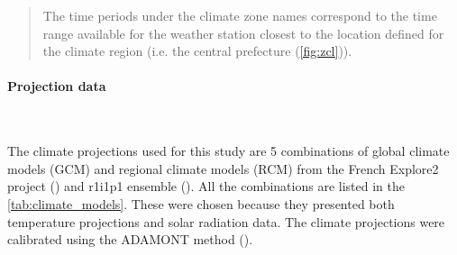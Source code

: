 \documentclass[11pt]{article}
\begin{document}
        \begin{table}[ht]
            \caption{\label{tab:rmse_safran_mf} Table of differences between SAFRAN reanalysis and Météo-France observation data (mean temperature MT and global radiation GR) for the 8 French climate zones.}
            \begin{quote}
                \vspace{-2mm}
                \small\noindent
                The time periods under the climate zone names correspond to the time range available for the weather station closest to the location defined for the climate region (i.e. the central prefecture (\ref{fig:zcl})). 
            \end{quote}
        \end{table}

        \paragraph{Projection data}\mbox{}\\ %
        \label{par:proj_data}

        The climate projections used for this study are 5 combinations of global climate models (GCM) and regional climate models (RCM) from the French Explore2 project (\cite{sauquet_explore2_2021}) and r1i1p1 ensemble (\cite{taylor_cmip5_2010}). All the combinations are listed in the \ref{tab:climate_models}. These were chosen because they presented both temperature projections and solar radiation data. The climate projections were calibrated using the ADAMONT method (\cite{verfaillie_method_2017}).\\
\end{document}
